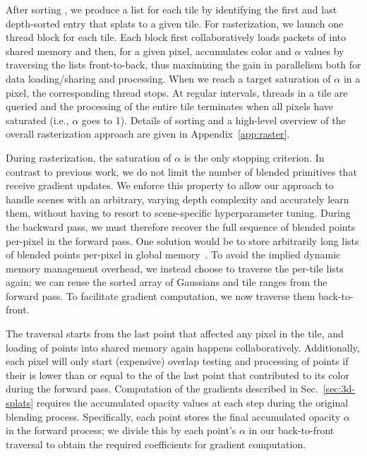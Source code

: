 After sorting , we produce a list for each tile by identifying the first and last depth-sorted entry that splats to a given tile. For rasterization, we launch one thread block for each tile. Each block first collaboratively loads packets of  into shared memory and then, for a given pixel, accumulates color and $\alpha$ values by traversing the lists front-to-back, thus maximizing the gain in parallelism both for data loading/sharing and processing.
When we reach a target saturation of $\alpha$ in a pixel, the corresponding thread stops. At regular intervals, threads in a tile are queried and the processing of the entire tile terminates when all pixels have saturated (i.e., $\alpha$ goes to 1). %
Details of sorting and a high-level overview of the overall rasterization approach are given in Appendix~\ref{app:raster}.

During rasterization, the saturation of $\alpha$ is the only stopping criterion. In contrast to previous work, we do not limit the number of blended primitives that receive gradient updates. We enforce this property to allow our approach to handle scenes with an arbitrary, varying depth complexity and accurately learn them, without having to resort to scene-specific hyperparameter tuning. 
During the backward pass, we must therefore recover the full sequence of blended points per-pixel in the forward pass. One solution would be to store arbitrarily long lists of blended points per-pixel in global memory~\cite{kopanas21}. To avoid the implied dynamic memory management overhead, we instead choose to traverse the per-tile lists again; we can reuse the sorted array of Gaussians and tile ranges from the forward pass. To facilitate gradient computation, we now traverse them back-to-front.

The traversal starts from the last point that affected any pixel in the tile, and loading of points into shared memory again happens collaboratively. Additionally, each pixel will only start (expensive) overlap testing and processing of points if their  is lower than or equal to the  of the last point that contributed to its color during the forward pass.
Computation of the gradients described in Sec.~\ref{sec:3d-splats} requires the accumulated opacity values at each step during the original blending process.
Specifically, each point stores the final accumulated opacity $\alpha$ in the forward process; we divide this by each point's $\alpha$ in our back-to-front traversal to obtain the required coefficients for gradient computation.



